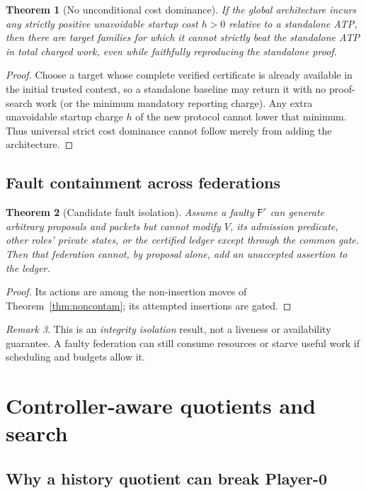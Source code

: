 \documentclass[11pt,letterpaper,oneside]{book}
\newtheorem{theorem}{Theorem}[chapter]
\theoremstyle{definition}
\theoremstyle{remark}
\newtheorem{remark}[theorem]{Remark}
\newcommand{\F}{\mathsf F}
\begin{document}
\begin{theorem}[No unconditional cost dominance]\label{thm:nomagic}
If the global architecture incurs any strictly positive unavoidable
startup cost $h>0$ relative to a standalone ATP, then there are target
families for which it cannot strictly beat the standalone ATP in
\emph{total charged work}, even while faithfully reproducing the
standalone proof.
\end{theorem}
\begin{proof}
Choose a target whose complete verified certificate is already
available in the initial trusted context, so a standalone baseline
may return it with no proof-search work (or the minimum mandatory
reporting charge). Any extra unavoidable startup charge $h$ of
the new protocol cannot lower that minimum. Thus universal strict
cost dominance cannot follow merely from adding the architecture.\end{proof}

\section{Fault containment across federations}
\begin{theorem}[Candidate fault isolation]\label{thm:isolate}
Assume a faulty $\F^r$ can generate arbitrary proposals and packets
but cannot modify $V$, its admission predicate, other roles' private
states, or the certified ledger except through the common gate. Then
that federation cannot, by proposal alone, add an unaccepted
assertion to the ledger.
\end{theorem}
\begin{proof}
Its actions are among the non-insertion moves of
Theorem~\ref{thm:noncontam}; its attempted insertions are gated.\end{proof}
\begin{remark}This is an \emph{integrity isolation} result, not a
liveness or availability guarantee. A faulty federation can still
consume resources or starve useful work if scheduling and budgets
allow it.\end{remark}

\chapter{Controller-aware quotients and search}
\section{Why a history quotient can break Player-0}
\end{document}
